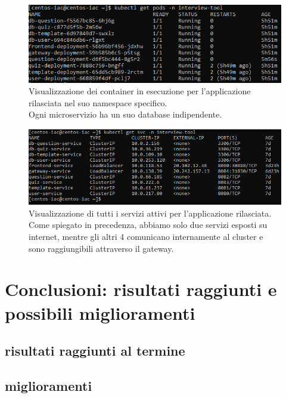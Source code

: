 \documentclass[a4paper,12pt]{report}
\begin{document}
\begin{figure}[h]
	\includegraphics[width=1.0\textwidth]{app_micro2}
    \caption{Visualizzazione dei container in esecuzione per l'applicazione rilasciata nel suo namespace specifico. \\Ogni microservizio ha un suo database indipendente.}
    \label{fig:app_micro2}
\end{figure}

\begin{figure}[h]
	\includegraphics[width=1.0\textwidth]{app_micro3}
    \caption{Visualizzazione di tutti i servizi attivi per l'applicazione rilasciata.\\Come spiegato in precedenza, abbiamo solo due servizi esposti su internet, mentre gli altri 4 comunicano internamente al cluster e sono raggiungibili attraverso il gateway.}
    \label{fig:app_micro3}
\end{figure}

\chapter{Conclusioni: risultati raggiunti e possibili miglioramenti}
\section{risultati raggiunti al termine}

\section{miglioramenti}
\end{document}
